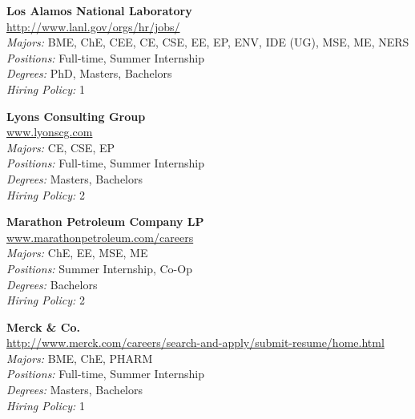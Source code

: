 \documentclass{article}
\begin{document}
\begin{center}
\begin{multicols}{3}
\begin{minipage}{.9\columnwidth}{\Large\bf Los Alamos National Laboratory }\\
	\url{http://www.lanl.gov/orgs/hr/jobs/}\\
	\emph{Majors:} BME, ChE, CEE, CE, CSE, EE, EP, ENV, IDE (UG), MSE, ME, NERS\\
	\emph{Positions:} Full-time, Summer Internship\\
	\emph{Degrees:} PhD, Masters, Bachelors\\
	\emph{Hiring Policy:} 1\\
\end{minipage}
 
\begin{minipage}{.9\columnwidth}{\Large\bf Lyons Consulting Group }\\
	\url{www.lyonscg.com}\\
	\emph{Majors:} CE, CSE, EP\\
	\emph{Positions:} Full-time, Summer Internship\\
	\emph{Degrees:} Masters, Bachelors\\
	\emph{Hiring Policy:} 2\\
\end{minipage}
 
\begin{minipage}{.9\columnwidth}{\Large\bf Marathon Petroleum Company LP }\\
	\url{www.marathonpetroleum.com/careers}\\
	\emph{Majors:} ChE, EE, MSE, ME\\
	\emph{Positions:} Summer Internship, Co-Op\\
	\emph{Degrees:} Bachelors\\
	\emph{Hiring Policy:} 2\\
\end{minipage}
 
\begin{minipage}{.9\columnwidth}{\Large\bf Merck \& Co. }\\
	\url{http://www.merck.com/careers/search-and-apply/submit-resume/home.html}\\
	\emph{Majors:} BME, ChE, PHARM\\
	\emph{Positions:} Full-time, Summer Internship\\
	\emph{Degrees:} Masters, Bachelors\\
	\emph{Hiring Policy:} 1\\
\end{minipage}
 

\end{multicols}
\end{center}
\end{document}
